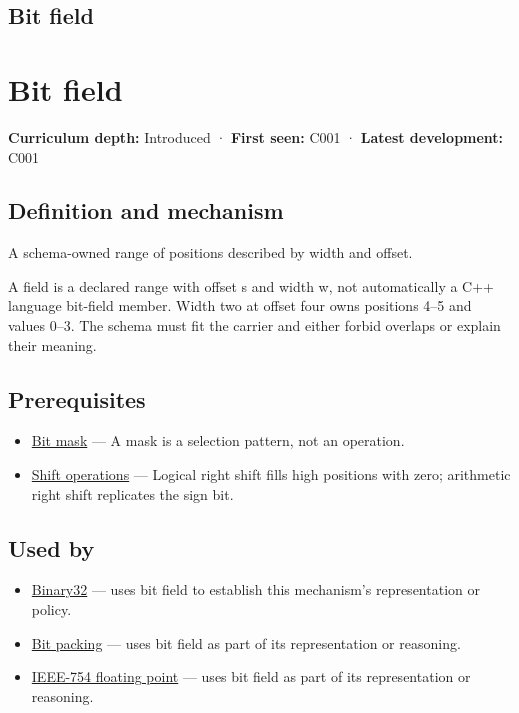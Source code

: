 \hypertarget{appendix-ac697f5c66e8}{}
\section*{Bit field}
\chapter{Bit field}\label{appendix-ac697f5c66e8-bit-field}

\textbf{Curriculum depth:} Introduced · \textbf{First seen:} C001 · \textbf{Latest development:} C001

\section{Definition and mechanism}\label{appendix-ac697f5c66e8-definition-and-mechanism}

A schema-owned range of positions described by width and offset.

A field is a declared range with offset s and width w, not automatically a C++ language bit-field member. Width two at offset four owns positions 4--5 and values 0--3. The schema must fit the carrier and either forbid overlaps or explain their meaning.

\section{Prerequisites}\label{appendix-ac697f5c66e8-prerequisites}

\begin{itemize}
\tightlist
\item
  \hyperref[appendix-dbe5905163c2]{Bit mask} --- A mask is a selection pattern, not an operation.
\item
  \hyperref[appendix-73425b25118e]{Shift operations} --- Logical right shift fills high positions with zero; arithmetic right shift replicates the sign bit.
\end{itemize}

\section{Used by}\label{appendix-ac697f5c66e8-used-by}

\begin{itemize}
\item
  \hyperref[appendix-5057f9ad327f]{Binary32} --- uses bit field to establish this mechanism's representation or policy.
\item
  \hyperref[appendix-1f9963e1a5d1]{Bit packing} --- uses bit field as part of its representation or reasoning.
\item
  \hyperref[appendix-343615f49ddf]{IEEE-754 floating point} --- uses bit field as part of its representation or reasoning.
\end{itemize}

